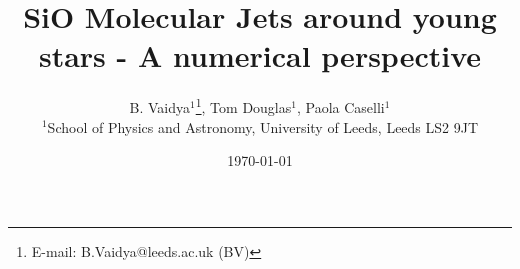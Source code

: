 \documentclass[useAMS,usenatbib,letters]{mn2e}
\begin{document}
\title{SiO Molecular Jets around young stars - A numerical perspective}
\author[B. Vaidya, Tom Douglas, Paola Caselli]{B. Vaidya$^{1}$\thanks{E-mail:
B.Vaidya@leeds.ac.uk (BV)}, Tom Douglas$^{1}$, Paola Caselli$^{1}$\\
$^{1}$School of Physics and Astronomy, University of Leeds, Leeds LS2
9JT\\
}

\date\today

\pagerange{\pageref{firstpage}--\pageref{lastpage}} 


\maketitle

\label{firstpage}
\end{document}
